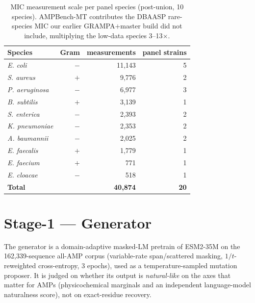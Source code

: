 \documentclass[11pt]{article}
\newcommand{\spn}[1]{\textit{#1}}
\begin{document}
\begin{table}[h]\centering\small
\caption{MIC measurement scale per panel species (post-union, 10 species). AMPBench-MT contributes
the DBAASP rare-species MIC our earlier GRAMPA$+$master build did not include, multiplying the
low-data species 3--13$\times$.}
\begin{tabular}{@{}lrrr@{}}
\toprule
\textbf{Species} & \textbf{Gram} & \textbf{measurements} & \textbf{panel strains} \\
\midrule
\spn{E. coli}        & $-$ & 11{,}143 & 5 \\
\spn{S. aureus}      & $+$ & 9{,}776  & 2 \\
\spn{P. aeruginosa}  & $-$ & 6{,}977  & 3 \\
\spn{B. subtilis}    & $+$ & 3{,}139  & 1 \\
\spn{S. enterica}    & $-$ & 2{,}393  & 2 \\
\spn{K. pneumoniae}  & $-$ & 2{,}353  & 2 \\
\spn{A. baumannii}   & $-$ & 2{,}025  & 2 \\
\spn{E. faecalis}    & $+$ & 1{,}779  & 1 \\
\spn{E. faecium}     & $+$ & 771      & 1 \\
\spn{E. cloacae}     & $-$ & 518      & 1 \\
\midrule
\textbf{Total}      &     & \textbf{40{,}874} & \textbf{20} \\
\bottomrule
\end{tabular}
\end{table}

\section{Stage-1 --- Generator}

The generator is a domain-adaptive masked-LM pretrain of ESM2-35M on the 162{,}339-sequence all-AMP
corpus (variable-rate span/scattered masking, $1/t$-reweighted cross-entropy, 3 epochs), used as a
temperature-sampled mutation proposer. It is judged on whether its output is \emph{natural-like} on
the axes that matter for AMPs (physicochemical marginals and an independent language-model
naturalness score), not on exact-residue recovery.
\end{document}

